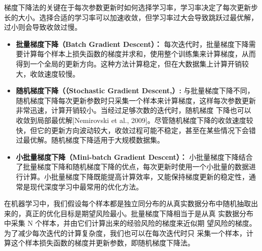 梯度下降法的关键在于每次参数更新时如何选择学习率，学习率决定了每次更新步长的大小。选择合适的学习率可以加速收敛，但学习率过大会导致跳跃过最优解，过小则会导致收敛过慢。
   
 
 \begin{itemize} 
\item  {\bf 批量梯度下降（Batch Gradient Descent）： }每次迭代时，批量梯度下降需要计算每个样本上损失函数的梯度并求和，使用整个训练集来计算梯度，从而得到一个全局的更新方向。这种方法计算稳定，但在大数据集上计算开销较大，收敛速度较慢。
 \item {\bf 随机梯度下降（（Stochastic Gradient Descent,）:}  与批量梯度下降不同，随机梯度下降每次更新参数时只采集一个样本来计算梯度，这样每次参数更新非常迅速，计算开销较小。当经过足够次数的迭代时，随机梯度 下降也可以收敛到局部最优解[Nemirovski et al., 2009]。尽管随机梯度下降的收敛速度较快，但它的更新方向波动较大，收敛过程可能不稳定，甚至在某些情况下会错过最优解。随机梯度下降适用于大规模数据集。
 \item {\bf 小批量梯度下降（Mini-batch Gradient Descent）：} 小批量梯度下降结合了批量梯度下降和随机梯度下降的优点，每次更新时使用一个小批量的数据进行计算。小批量梯度下降既能提高计算效率，又能保持梯度更新的稳定性，通常是现代深度学习中最常用的优化方法。
\end{itemize}

在机器学习中，我们假设每个样本都是独立同分布的从真实数据分布中随机抽取出来的，真正的优化目标是期望风险最小。批量梯度下降相当于是从真 实数据分布中采集 N 个样本，并由它们计算出来的经验风险的梯度来近似期 望风险的梯度。为了减少每次迭代的计算复杂度，我们也可以在每次迭代时只 采集一个样本，计算这个样本损失函数的梯度并更新参数，即随机梯度下降法。

